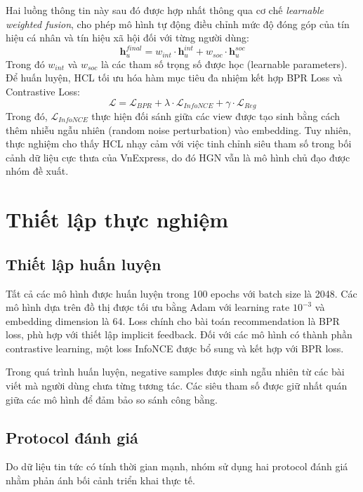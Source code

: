 \documentclass[11pt]{article}
\begin{document}
Hai luồng thông tin này sau đó được hợp nhất thông qua cơ chế \textit{learnable weighted fusion}, cho phép mô hình tự động điều chỉnh mức độ đóng góp của tín hiệu cá nhân và tín hiệu xã hội đối với từng người dùng:
\begin{equation}
    \mathbf{h}_u^{final} = w_{int} \cdot \mathbf{h}_u^{int} + w_{soc} \cdot \mathbf{h}_u^{soc}
\end{equation}
Trong đó $w_{int}$ và $w_{soc}$ là các tham số trọng số được học (learnable parameters). Để huấn luyện, HCL tối ưu hóa hàm mục tiêu đa nhiệm kết hợp BPR Loss và Contrastive Loss:
\begin{equation}
    \mathcal{L} = \mathcal{L}_{BPR} + \lambda \cdot \mathcal{L}_{InfoNCE} + \gamma \cdot \mathcal{L}_{Reg}
\end{equation}
Trong đó, $\mathcal{L}_{InfoNCE}$ thực hiện đối sánh giữa các view được tạo sinh bằng cách thêm nhiễu ngẫu nhiên (random noise perturbation) vào embedding. Tuy nhiên, thực nghiệm cho thấy HCL nhạy cảm với việc tinh chỉnh siêu tham số trong bối cảnh dữ liệu cực thưa của VnExpress, do đó HGN vẫn là mô hình chủ đạo được nhóm đề xuất.

\section{Thiết lập thực nghiệm}
\label{sec:exp}

\subsection{Thiết lập huấn luyện}
Tất cả các mô hình được huấn luyện trong 100 epochs
với batch size là 2048.
Các mô hình dựa trên đồ thị được tối ưu bằng Adam
với learning rate $10^{-3}$ và embedding dimension là 64.
Loss chính cho bài toán recommendation là BPR loss,
phù hợp với thiết lập implicit feedback.
Đối với các mô hình có thành phần contrastive learning,
một loss InfoNCE được bổ sung và kết hợp với BPR loss.

Trong quá trình huấn luyện,
negative samples được sinh ngẫu nhiên từ các bài viết
mà người dùng chưa từng tương tác.
Các siêu tham số được giữ nhất quán giữa các mô hình
để đảm bảo so sánh công bằng.

\subsection{Protocol đánh giá}
Do dữ liệu tin tức có tính thời gian mạnh, nhóm sử dụng hai protocol đánh giá
nhằm phản ánh bối cảnh triển khai thực tế.
\end{document}
